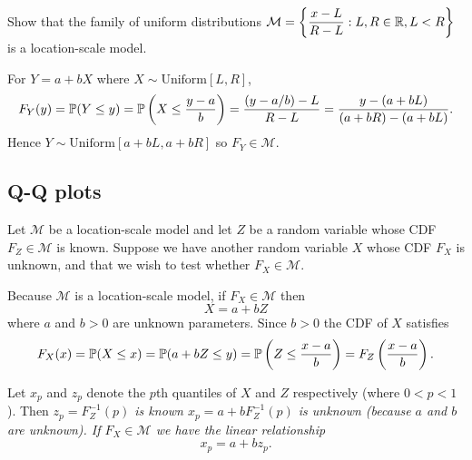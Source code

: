 \begin{example}
Show that the family of uniform distributions $\mathcal{M}=\left\{\displaystyle\frac{x-L}{R-L}:L,R\in\mathbb{R}, L<R\right\}$ is a location-scale model.
\begin{solution}
For $Y=a+bX$ where $X\sim\text{Uniform}[L,R]$,
\[
F_Y(y) = \mathbb{P}(Y\leq y) = \mathbb{P}\left(X\leq\frac{y-a}{b}\right) 
	= \frac{(y-a/b)-L}{R-L} 
	= \frac{y - (a+bL)}{(a+bR)-(a+bL)}.
\]
Hence $Y\sim\text{Uniform}[a+bL, a+bR]$ so $F_Y\in\mathcal{M}$.
\end{solution}
\end{example}


\subsection{Q-Q plots}
Let $\mathcal{M}$ be a location-scale model and let $Z$ be a random variable whose CDF $F_Z\in\mathcal{M}$ is known. Suppose we have another random variable $X$ whose CDF $F_X$ is unknown, and that we wish to test whether $F_X\in\mathcal{M}$. 


Because $\mathcal{M}$ is a location-scale model, if $F_X\in\mathcal{M}$ then
\[
X = a + bZ %
\]
where $a$ and $b>0$ are unknown parameters. Since $b>0$ the CDF of $X$ satisfies
\[
F_X(x) = \mathbb{P}(X\leq x) = \mathbb{P}(a+bZ\leq y) = \mathbb{P}\left(Z\leq\frac{x-a}{b}\right) = F_Z\left(\frac{x-a}{b}\right).
\]

Let $x_p$ and $z_p$ denote the $p$th quantiles of $X$ and $Z$ respectively (where $0<p<1$). Then
\bit
\it $z_p = F_Z^{-1}(p)$ is known
\it $x_p = a + bF_Z^{-1}(p)$ is unknown (because $a$ and $b$ are unknown).
\eit
If $F_X\in\mathcal{M}$ we have the linear relationship 
\[
x_p = a + b z_p.
\]

